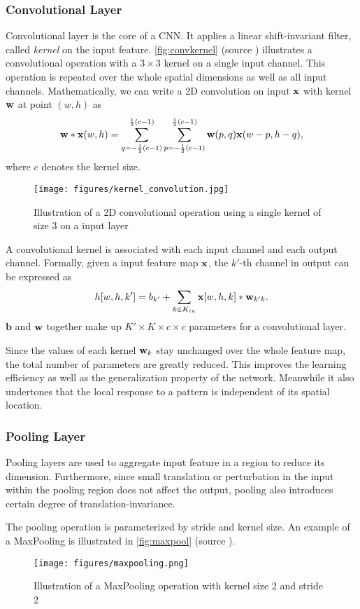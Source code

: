 \subsubsection{Convolutional Layer}\label{sec:cnnlayers}
Convolutional layer is the core of a CNN. It applies a linear shift-invariant filter, called \textit{kernel} on the input feature.
\autoref{fig:convkernel} (source \cite{iosconvolution}) illustrates a convolutional operation with a $ 3\times3 $ kernel on a single input channel. This operation is repeated over the whole spatial dimensions as well as all input channels. 
Mathematically, we can write a 2D convolution on input $ \mathbf{x} $ with kernel $ \mathbf{w} $ at point $ (w, h) $ as
\[ \mathbf{w} \ast \mathbf{x}(w,h) =  \sum_{q=-\frac{1}{2}(c-1)}^{\frac{1}{2}(c-1)}\sum_{p=-\frac{1}{2}(c-1)}^{\frac{1}{2}(c-1)}\mathbf{w}(p,q)\mathbf{x}(w-p,h-q), \]
where $ c $ denotes the kernel size.

\begin{figure}[h]
\centering
\texttt{[image: figures/kernel\_convolution.jpg]}
\caption[Illustration of 2D convolution]{Illustration of a 2D convolutional operation using a single kernel of size 3 on a input layer}\label{fig:convkernel}
\end{figure}
A convolutional kernel is associated with each input channel and each output channel. Formally, given a input feature map $ \mathbf{x}$, the $ k' $-th channel in output can be expressed as
\[ h[w, h, k'] = b_{k'} + \sum_{k\in K_{in}}\mathbf{x}[w,h,k]\ast\mathbf{w}_{k'k}. \]
$\mathbf{b} $ and $ \mathbf{w} $ together make up $ K'\times K\times c\times c $ parameters for a convolutional layer. 

Since the values of each kernel $ \mathbf{w}_k $ stay unchanged over the whole feature map, the total number of parameters are greatly reduced. This improves the learning efficiency as well as the generalization property of the network. Meanwhile it also undertones that the local response to a pattern is independent of its spatial location.
\subsubsection{Pooling Layer}
Pooling layers are used to aggregate input feature in a region to reduce its dimension. Furthermore, since small translation or perturbation in the input within the pooling region does not affect the output, pooling also introduces certain degree of translation-invariance.

The pooling operation is parameterized by stride and kernel size. An example of a MaxPooling is illustrated in \autoref{fig:maxpool} (source \cite{standfordonline}).
\begin{figure}[h]
\centering
\texttt{[image: figures/maxpooling.png]}
\caption[Illustration of MaxPooling]{Illustration of a MaxPooling operation with kernel size 2 and stride 2}\label{fig:maxpool}
\end{figure}
